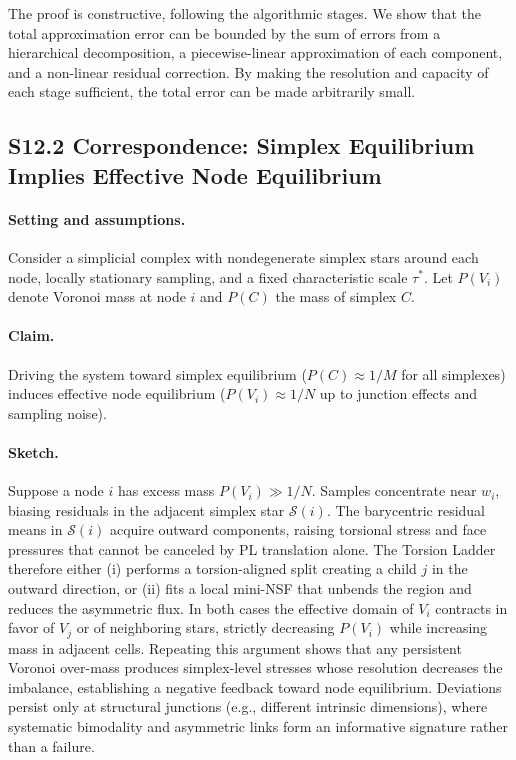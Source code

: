 \documentclass[11pt]{article}
\begin{document}
The proof is constructive, following the algorithmic stages. We show that the total approximation error can be bounded by the sum of errors from a hierarchical decomposition, a piecewise-linear approximation of each component, and a non-linear residual correction. By making the resolution and capacity of each stage sufficient, the total error can be made arbitrarily small.

\subsection*{S12.2 Correspondence: Simplex Equilibrium Implies Effective Node Equilibrium}
\paragraph{Setting and assumptions.} Consider a simplicial complex with nondegenerate simplex stars around each node, locally stationary sampling, and a fixed characteristic scale $\tau^*$. Let $P(V_i)$ denote Voronoi mass at node $i$ and $P(C)$ the mass of simplex $C$.

\paragraph{Claim.} Driving the system toward simplex equilibrium ($P(C) \approx 1/M$ for all simplexes) induces effective node equilibrium ($P(V_i) \approx 1/N$ up to junction effects and sampling noise).

\paragraph{Sketch.} Suppose a node $i$ has excess mass $P(V_i) \gg 1/N$. Samples concentrate near $w_i$, biasing residuals in the adjacent simplex star $\mathcal S(i)$. The barycentric residual means in $\mathcal S(i)$ acquire outward components, raising torsional stress and face pressures that cannot be canceled by PL translation alone. The Torsion Ladder therefore either (i) performs a torsion-aligned split creating a child $j$ in the outward direction, or (ii) fits a local mini-NSF that unbends the region and reduces the asymmetric flux. In both cases the effective domain of $V_i$ contracts in favor of $V_j$ or of neighboring stars, strictly decreasing $P(V_i)$ while increasing mass in adjacent cells. Repeating this argument shows that any persistent Voronoi over-mass produces simplex-level stresses whose resolution decreases the imbalance, establishing a negative feedback toward node equilibrium. Deviations persist only at structural junctions (e.g., different intrinsic dimensions), where systematic bimodality and asymmetric links form an informative signature rather than a failure.
\end{document}
